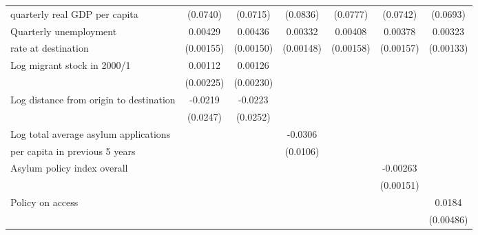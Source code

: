 \begin{table}[!ht]
\begin{tabular}{l*{6}{c}}
 quarterly real GDP per capita                    &    (0.0740)         &    (0.0715)         &    (0.0836)         &    (0.0777)         &    (0.0742)         &    (0.0693)         \\
[0,5em]
Quarterly unemployment&     0.00429\sym{**} &     0.00436\sym{**} &     0.00332\sym{*}  &     0.00408\sym{*}  &     0.00378\sym{*}  &     0.00323\sym{*}  \\
 rate at destination                    &   (0.00155)         &   (0.00150)         &   (0.00148)         &   (0.00158)         &   (0.00157)         &   (0.00133)         \\
[0,5em]
Log migrant stock in 2000/1&     0.00112         &     0.00126         &                     &                     &                     &                     \\
                    &   (0.00225)         &   (0.00230)         &                     &                     &                     &                     \\
[0,5em]
Log distance from origin to destination&     -0.0219         &     -0.0223         &                     &                     &                     &                     \\
                    &    (0.0247)         &    (0.0252)         &                     &                     &                     &                     \\
[0,5em]
Log total average asylum applications &                     &                     &     -0.0306\sym{**} &                     &                     &                     \\
per capita in previous 5 years                    &                     &                     &    (0.0106)         &                     &                     &                     \\
[0,5em]
Asylum policy index overall&                     &                     &                     &                     &    -0.00263         &                     \\
                    &                     &                     &                     &                     &   (0.00151)         &                     \\
[0,5em]
Policy on access    &                     &                     &                     &                     &                     &      0.0184\sym{***}\\
                    &                     &                     &                     &                     &                     &   (0.00486)         \\

\end{tabular}
\end{table}
